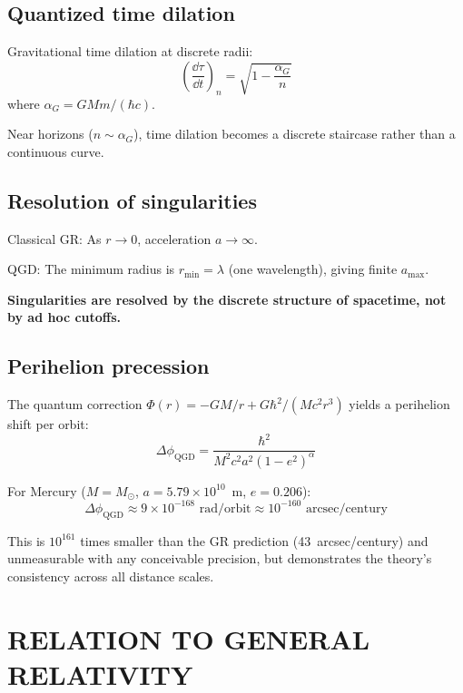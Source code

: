 \documentclass[11pt,a4paper]{article}
\theoremstyle{definition}
\theoremstyle{remark}
\begin{document}
	\subsection{Quantized time dilation}
	
	Gravitational time dilation at discrete radii:
	\begin{equation}
		\left(\frac{\dd\tau}{\dd t}\right)_n = \sqrt{1 - \frac{\alpha_G}{n}}
		\label{eq:quantized_dilation}
	\end{equation}
	where $\alpha_G = GMm/(\hbar c)$.
	
	Near horizons ($n \sim \alpha_G$), time dilation becomes a discrete staircase rather than a continuous curve.
	
	\subsection{Resolution of singularities}
	
	Classical GR: As $r \to 0$, acceleration $a \to \infty$.
	
	QGD: The minimum radius is $r_{\text{min}} = \lambda$ (one wavelength), giving finite $a_{\text{max}}$.
	
	\textbf{Singularities are resolved by the discrete structure of spacetime, not by ad hoc cutoffs.}
	
	\subsection{Perihelion precession}
	
	The quantum correction $\Phi(r) = -GM/r + G\hbar^2/(Mc^2r^3)$ yields a perihelion shift per orbit:
	\begin{equation}
		\Delta\phi_{\text{QGD}} = \frac{\hbar^2}{M^2 c^2 a^2(1-e^2)^{\alpha}}
		\label{eq:perihelion_qgd}
	\end{equation}
	
	For Mercury ($M = M_\odot$, $a = 5.79 \times 10^{10}$~m, $e = 0.206$):
	\begin{equation}
		\Delta\phi_{\text{QGD}} \approx 9 \times 10^{-168}\text{ rad/orbit} \approx 10^{-160}\text{ arcsec/century}
		\label{eq:perihelion_mercury}
	\end{equation}
	
	This is $10^{161}$ times smaller than the GR prediction (43~arcsec/century) and unmeasurable with any conceivable precision, but demonstrates the theory's consistency across all distance scales.
	
	\section{RELATION TO GENERAL RELATIVITY}
	\label{sec:relation}
	
\end{document}
